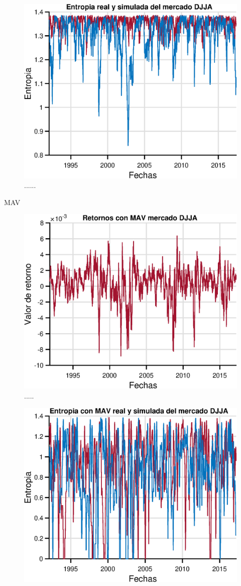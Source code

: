 \begin{figure}
	\centering
	\includegraphics[width=0.7\linewidth]{figures/onlyentropyeps}
	\caption{......}
	\label{onlyentropyeps}
\end{figure}





MAV

\begin{figure}
	\centering
	\includegraphics[width=0.7\linewidth]{figures/MAVreturnseps}
	\caption{.....}
	\label{fig:mavreturnseps}
\end{figure}



\begin{figure}
	\centering
	\includegraphics[width=0.7\linewidth]{figures/MAVentropy}
	\caption{}
	\label{fig:maventropy}
\end{figure}
